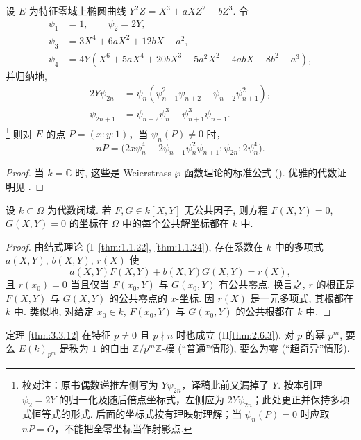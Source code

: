 \begin{lemma} \label{thm:3.3.14} 
设 $E$ 为特征零域上椭圆曲线 $Y^2Z = X^3 + aXZ^2 + bZ^3$. 令
\begin{align*}
  \psi_1 &= 1, \qquad \psi_2 = 2Y,\\
  \psi_3 &= 3X^4 + 6aX^2 + 12bX - a^2,\\
  \psi_4 &= 4Y(X^6 + 5aX^4 + 20bX^3 - 5a^2X^2 - 4abX - 8b^2 - a^3),
\end{align*}
并归纳地,
\[
\begin{aligned}
2Y\psi_{2n} &= \psi_n(\psi_{n-1}^2\psi_{n+2} - \psi_{n-2}\psi_{n+1}^2),\\
\psi_{2n+1} &= \psi_{n+2}\psi_n^3 - \psi_{n+1}^3\psi_{n-1}.
\end{aligned}
\]
\footnote{校对注：原书偶数递推左侧写为 $Y\psi_{2n}$，译稿此前又漏掉了 $Y$. 按本引理 $\psi_2=2Y$ 的归一化及随后倍点坐标式，左侧应为 $2Y\psi_{2n}$；此处更正并保持多项式恒等式的形式. 后面的坐标式按有理映射理解；当 $\psi_n(P)=0$ 时应取 $nP=O$，不能把全零坐标当作射影点.} 则对 $E$ 的点 $P = (x:y:1)$，当 $\psi_n(P)\neq 0$ 时，
\[
nP = \bigl(2x\psi_n^4-2\psi_{n-1}\psi_n^2\psi_{n+1}:\psi_{2n}:2\psi_n^4\bigr).
\]
\end{lemma}

\begin{proof}
当 $k = \mathbb{C}$ 时, 这些是 Weierstrass $\wp$ 函数理论的标准公式 (\cite[III, \S 58]{weber1908}). 优雅的代数证明见 \cite[Formulary]{cassels1991}.
\end{proof}

\begin{lemma} \label{thm:3.3.15} 
设 $k\subset\Omega$ 为代数闭域. 若 $F, G\in k[X, Y]$ 无公共因子, 则方程 $F(X, Y) = 0$, $G(X, Y) = 0$ 的坐标在 $\Omega$ 中的每个公共解坐标都在 $k$ 中.
\end{lemma}

\begin{proof}
由结式理论 (I~\ref{thm:1.1.22}, \ref{thm:1.1.24}), 存在系数在 $k$ 中的多项式 $a(X, Y)$, $b(X, Y)$, $r(X)$ 使
\[
a(X, Y)F(X, Y) + b(X, Y)G(X, Y) = r(X),
\]
且 $r(x_0) = 0$ 当且仅当 $F(x_0, Y)$ 与 $G(x_0, Y)$ 有公共零点. 换言之, $r$ 的根正是 $F(X, Y)$ 与 $G(X, Y)$ 的公共零点的 $x$-坐标. 因 $r(X)$ 是一元多项式, 其根都在 $k$ 中. 类似地, 对给定 $x_0\in k$, $F(x_0, Y)$ 与 $G(x_0, Y)$ 的公共根都在 $k$ 中.
\end{proof}

\begin{remark} \label{thm:3.3.16} 
定理 \ref{thm:3.3.12} 在特征 $p\neq 0$ 且 $p\nmid n$ 时也成立 (II\ref{thm:2.6.3}). 对 $p$ 的幂 $p^m$, 要么 $E(k)_{p^m}$ 是秩为 $1$ 的自由 $\mathbb{Z}/p^m\mathbb{Z}$-模 (``普通''情形), 要么为零 (``超奇异''情形).
\end{remark}

